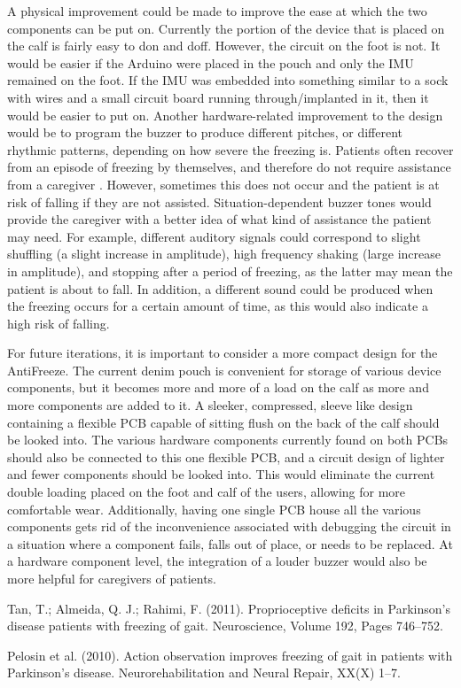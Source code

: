 \documentclass[titlepage]{article}
\begin{document}
\begin{doublespacing}
A physical improvement could be made to improve the ease at which the two components can be put on. Currently the portion of the device that is placed on the calf is fairly easy to don and doff. However, the circuit on the foot is not. It would be easier if the Arduino were placed in the pouch and only the IMU remained on the foot. If the IMU was embedded into something similar to a sock with wires and a small circuit board running through/implanted in it, then it would be easier to put on.
Another hardware-related improvement to the design would be to program the buzzer to produce different pitches, or different rhythmic patterns, depending on how severe the freezing is. Patients often recover from an episode of freezing by themselves, and therefore do not require assistance from a caregiver \cite{pelosin}. However, sometimes this does not occur and the patient is at risk of falling if they are not assisted. Situation-dependent buzzer tones would provide the caregiver with a better idea of what kind of assistance the patient may need. For example, different auditory signals could correspond to slight shuffling (a slight increase in amplitude), high frequency shaking (large increase in amplitude), and stopping after a period of freezing, as the latter may mean the patient is about to fall. In addition, a different sound could be produced when the freezing occurs for a certain amount of time, as this would also indicate a high risk of falling.

     For future iterations, it is important to consider a more compact design for the AntiFreeze. The current denim pouch is convenient for storage of various device components, but it becomes more and more of a load on the calf as more and more components are added to it. A sleeker, compressed, sleeve like design containing a flexible PCB capable of sitting flush on the back of the calf should be looked into. The various hardware components currently found on both PCBs should also be connected to this one flexible PCB, and a circuit design of lighter and fewer components should be looked into. This would eliminate the current double loading placed on the foot and calf of the users, allowing for more comfortable wear. Additionally, having one single PCB house all the various components gets rid of the inconvenience associated with debugging the circuit in a situation where a component fails, falls out of place, or needs to be replaced. At a hardware component level, the integration of a louder buzzer would also be more helpful for caregivers of patients. 

\clearpage
\begin{thebibliography}{99}
Tan, T.; Almeida, Q. J.; Rahimi, F.
(2011).
Proprioceptive deficits in Parkinson's disease patients with freezing of gait.
Neuroscience, Volume 192, Pages 746–752.

Pelosin et al.
(2010).
Action observation improves freezing of gait in patients with Parkinson's disease.
Neurorehabilitation and Neural Repair, XX(X) 1–7.

\end{thebibliography}
\end{doublespacing}
\end{document}
